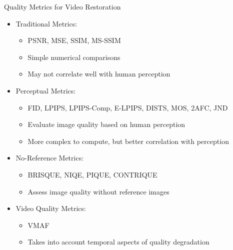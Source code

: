 \documentclass{beamer}
\begin{document}
\begin{frame}{Quality Metrics for Video Restoration}
\begin{itemize}
  \item Traditional Metrics:
  \begin{itemize}
    \item PSNR, MSE, SSIM, MS-SSIM
    \item Simple numerical comparisons
    \item May not correlate well with human perception
  \end{itemize}
  \item Perceptual Metrics:
  \begin{itemize}
    \item FID, LPIPS, LPIPS-Comp, E-LPIPS, DISTS, MOS, 2AFC, JND
    \item Evaluate image quality based on human perception
    \item More complex to compute, but better correlation with perception
  \end{itemize}
  \item No-Reference Metrics:
  \begin{itemize}
    \item BRISQUE, NIQE, PIQUE, CONTRIQUE
    \item Assess image quality without reference images
  \end{itemize}
  \item Video Quality Metrics:
  \begin{itemize}
    \item VMAF
    \item Takes into account temporal aspects of quality degradation
  \end{itemize}
  \end{itemize}
\end{frame}
\end{document}

